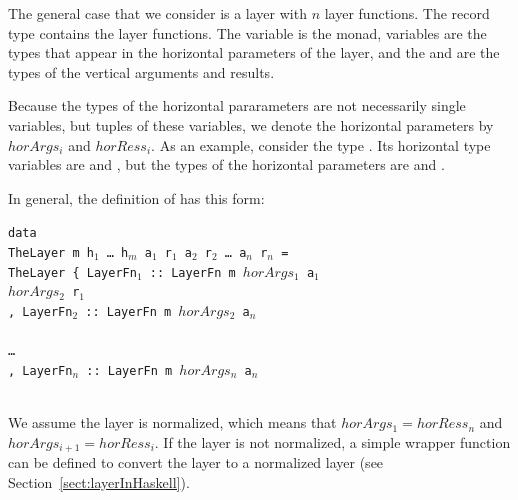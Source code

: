 \documentclass[preprint,natbib]{sigplanconf}
\begin{document}
 


The general case that we consider is a layer with $n$ layer functions. The record type  contains the layer functions. The variable  is the monad, variables  are the types that appear in the horizontal parameters of the layer, and the  and  are the types of the vertical arguments and results. 

Because the types of the horizontal pararameters are not necessarily single  variables, but tuples of these variables, we denote the horizontal parameters by $horArgs_i$ and $horRess_i$. As an example, consider the type . Its horizontal  type variables are  and , but the types of the horizontal parameters are  and . 

In general, the definition of  has this form:

\begin{small}
\begin{tabbing}
{\tt da}\={\tt ta}\\
\> {\tt Th}\={\tt eLayer~m h$_1$ \dots ~h$_m$ a$_1$ r$_1$ a$_2$ r$_2$ \dots ~a$_n$ r$_n$ = }\\
\> \> {\tt TheLayer~}\={\tt \{~LayerFn$_1$}\verb| :: |{\tt LayerFn~m~}\= {\tt $horArgs_1$ a$_1$}\\
\> \>                \>                                             \> {\tt $horArgs_2$ r$_1$}\\
\>\>\> {\tt , LayerFn$_2$}\verb| :: |{\tt LayerFn~m~}\={\tt $horArgs_2$ a$_n$}\\
\> \>                \>                            \\
\>\>\> {\tt \dots }\\
\>\>\> {\tt , LayerFn$_n$}\verb| :: |{\tt LayerFn~m~}\={\tt $horArgs_{n}$ a$_n$}\\
\> \>                \>                            \\
\end{tabbing}
\end{small}

We assume the layer is normalized, which means that $horArgs_{1} = horRess_n$ and 
$horArgs_{i+1} = horRess_i$. If the layer is not normalized, a simple wrapper function can be defined to convert the layer to a normalized layer (see Section~\ref{sect:layerInHaskell}). 
\end{document}
